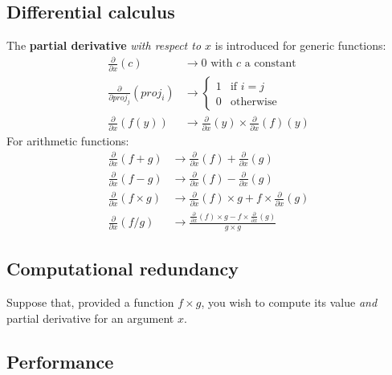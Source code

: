 \documentclass[a4paper]{article}
\begin{document}
\subsection{Differential calculus}

The \textbf{partial derivative} \textit{with respect to $x$} is introduced for generic functions:
\begin{align}
\frac{\partial}{\partial x}(c) &\rightarrow 0 \text{ with $c$ a constant} \\
\frac{\partial}{\partial proj_j}(proj_i) &\rightarrow
\begin{cases}{}
1 & \text{if $i = j$} \\
0 & \text{otherwise}
\end{cases} \\
\frac{\partial}{\partial x}(f(y)) &\rightarrow \frac{\partial}{\partial x}(y) \times \frac{\partial}{\partial x}(f)(y)
\end{align}
For arithmetic functions:
\begin{align}
\frac{\partial}{\partial x}(f + g) &\rightarrow \frac{\partial}{\partial x}(f) + \frac{\partial}{\partial x}(g) \\
\frac{\partial}{\partial x}(f - g) &\rightarrow \frac{\partial}{\partial x}(f) - \frac{\partial}{\partial x}(g) \\
\frac{\partial}{\partial x}(f \times g) &\rightarrow \frac{\partial}{\partial x}(f) \times g + f \times \frac{\partial}{\partial x}(g) \\
\frac{\partial}{\partial x}(f / g) &\rightarrow \frac{\frac{\partial}{\partial x}(f) \times g - f \times \frac{\partial}{\partial x}(g)}{g \times g}
\end{align}

\subsection{Computational redundancy}

Suppose that, provided a function $f \times g$, you wish to compute its value \emph{and} partial derivative for an argument $x$.



\subsection{Performance}

%
%
%
%
\end{document}
